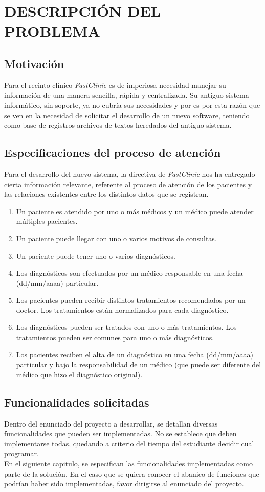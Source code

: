 \documentclass[12pt,letterpaper]{article}
\begin{document}
\section{DESCRIPCIÓN DEL PROBLEMA}

	\subsection{Motivación}
	Para el recinto clínico \textsl{FastClinic} es de imperiosa necesidad manejar su información de una manera sencilla, rápida y centralizada. Su antiguo sistema informático, sin soporte, ya no cubría sus necesidades y por es por esta razón que se ven en la necesidad de solicitar el desarrollo de un nuevo software, teniendo como base de registros archivos de textos heredados del antiguo sistema.

	\subsection{Especificaciones del proceso de atención}
	Para el desarrollo del nuevo sistema, la directiva de \textsl{FastClinic} nos ha entregado cierta información relevante, referente al proceso de atención de los pacientes y las relaciones existentes entre los distintos datos que se registran.
	\begin{enumerate}
	\item Un paciente es atendido por uno o más médicos y un médico puede atender múltiples pacientes.
	\item Un paciente puede llegar con uno o varios motivos de consultas.
	\item Un paciente puede tener uno o varios diagnósticos.
	\item Los diagnósticos son efectuados por un médico responsable en una fecha (dd/mm/aaaa) particular.
	\item Los pacientes pueden recibir distintos tratamientos recomendados por un doctor. Los tratamientos están normalizados para cada diagnóstico.
	\item Los diagnósticos pueden ser tratados con uno o más tratamientos. Los tratamientos pueden ser comunes para uno o más diagnósticos.
	\item Los pacientes reciben el alta de un diagnóstico en una fecha (dd/mm/aaaa) particular y bajo la responsabilidad de un médico (que puede ser diferente del médico que hizo el diagnóstico original).
	\end{enumerate}

	\subsection{Funcionalidades solicitadas}
	Dentro del enunciado del proyecto a desarrollar, se detallan diversas funcionalidades que pueden ser implementadas. No se establece que deben implementarse todas, quedando a criterio del tiempo del estudiante decidir cual programar. \\
	En el siguiente capitulo, se especifican las funcionalidades implementadas como parte de la solución. En el caso que se quiera conocer el abanico de funciones que podrían haber sido implementadas, favor dirigirse al enunciado del proyecto.
\end{document}
